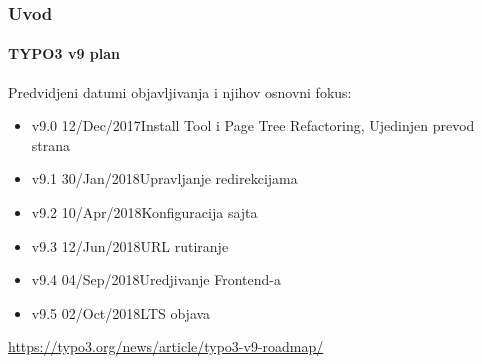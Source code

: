 \begin{frame}[fragile]
	\frametitle{Uvod}
	\framesubtitle{TYPO3 v9 plan}

	Predvidjeni datumi objavljivanja i njihov osnovni fokus:

	\begin{itemize}

		\item v9.0 \tabto{1.1cm}12/Dec/2017\tabto{3.4cm}Install Tool i Page Tree Refactoring,\newline
			\tabto{3.4cm}Ujedinjen prevod strana
		\item
			\begingroup
				\color{typo3orange}
					v9.1 \tabto{1.1cm}30/Jan/2018\tabto{3.4cm}Upravljanje redirekcijama
			\endgroup
		\item v9.2 \tabto{1.1cm}10/Apr/2018\tabto{3.4cm}Konfiguracija sajta
		\item v9.3 \tabto{1.1cm}12/Jun/2018\tabto{3.4cm}URL rutiranje
		\item v9.4 \tabto{1.1cm}04/Sep/2018\tabto{3.4cm}Uredjivanje Frontend-a
		\item v9.5 \tabto{1.1cm}02/Oct/2018\tabto{3.4cm}LTS objava

	\end{itemize}

	\smaller
		\url{https://typo3.org/news/article/typo3-v9-roadmap/}
	\normalsize

\end{frame}

